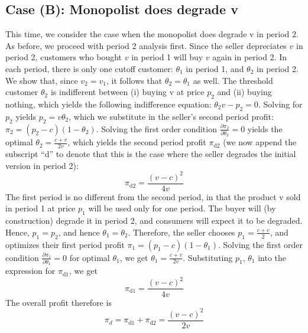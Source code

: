 \documentclass[isre,blindrev]{informs3} %
\begin{document}
\subsection{Case (B): Monopolist does degrade v}
\label{no-innovate-degrade}

This time, we consider the case when the monopolist does degrade v in period 2. As before, we proceed with period 2 analysis first. Since the seller depreciates \(v\) in period 2, customers who bought \(v\) in period 1 will buy
\(v\) again in period 2. In each period, there is only one cutoff customer: \(\theta _1\) in period 1, and \(\theta _2\) in period 2. We show that,
since \(v_2=v_1\), it follows that \(\theta _2=\theta _1\) as well. The threshold customer \(\theta _2\) is indifferent between (i) buying v at price
\(p_2\) and (ii) buying nothing, which yields the following indifference equation: \(\theta _2v-p_2=0\). Solving for \(p_2\) yields { }\(p_2=v \theta
_2\), which we substitute in the seller{'}s second period profit: \(\pi _2=\left(p_2-c\right)\left(1-\theta _2\right)\). Solving the first order
condition \(\frac{\partial \pi _2}{\partial \theta _2}=0\) yields the optimal \(\theta _2=\frac{c+v}{2 v}\), which yields the second period profit
\(\pi _{\text{d2}}\) (we now append the subscript {``}d{''} to denote that this is the case where the seller degrades the initial version in period
2):
\begin{equation}\label{pi_d2_no_innov_degrade}
\pi _{\text{d2}}=\frac{(v-c)^2}{4 v}
\end{equation}
The first period is no different from the second period, in that the product v sold in period 1 at price \(p_1\) will be used only for one period.
The buyer will (by construction) degrade it in period 2, and consumers will expect it to be degraded. Hence, \(p_1=p_2\), and hence \(\theta _1=\theta
_2\). Therefore, the seller chooses \(p_1=\frac{c+v}{2}\), and optimizes their first period profit \(\pi _1=\left(p_1-c\right)\left(1-\theta _1\right)\).
Solving the first order condition \(\frac{\partial \pi _1}{\partial \theta _1}=0\) for optimal \(\theta _1\), we get \(\theta _1=\frac{c+v}{2 v}\).
Substituting \(p_1\), \(\theta _1\) into the expression for \(\pi _{\text{d1}}\), we get 
\begin{equation}
\pi _{\text{d1}}=\frac{(v-c)^2}{4 v}
\end{equation}
The overall profit therefore is 
\begin{equation}\label{pi_d_no_innov_degrade}
\pi _d =\pi _{\text{d1}}+\pi _{\text{d2}}=\frac{(v-c)^2}{2 v}
\end{equation}
\end{document}
